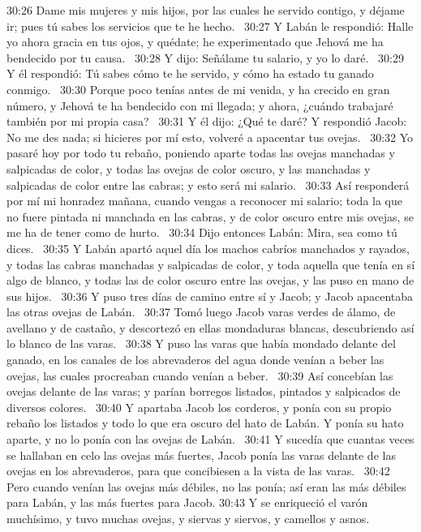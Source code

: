 30:26 Dame mis mujeres y mis hijos, por las cuales he servido contigo, y déjame ir; pues tú sabes los servicios que te he hecho.  
30:27 Y Labán le respondió: Halle yo ahora gracia en tus ojos, y quédate; he experimentado que Jehová me ha bendecido por tu causa.  
30:28 Y dijo: Señálame tu salario, y yo lo daré.  
30:29 Y él respondió: Tú sabes cómo te he servido, y cómo ha estado tu ganado conmigo.  
30:30 Porque poco tenías antes de mi venida, y ha crecido en gran número, y Jehová te ha bendecido con mi llegada; y ahora, ¿cuándo trabajaré también por mi propia casa?  
30:31 Y él dijo: ¿Qué te daré? Y respondió Jacob: No me des nada; si hicieres por mí esto, volveré a apacentar tus ovejas.  
30:32 Yo pasaré hoy por todo tu rebaño, poniendo aparte todas las ovejas manchadas y salpicadas de color, y todas las ovejas de color oscuro, y las manchadas y salpicadas de color entre las cabras; y esto será mi salario.  
30:33 Así responderá por mí mi honradez mañana, cuando vengas a reconocer mi salario; toda la que no fuere pintada ni manchada en las cabras, y de color oscuro entre mis ovejas, se me ha de tener como de hurto.  
30:34 Dijo entonces Labán: Mira, sea como tú dices.  
30:35 Y Labán apartó aquel día los machos cabríos manchados y rayados, y todas las cabras manchadas y salpicadas de color, y toda aquella que tenía en sí algo de blanco, y todas las de color oscuro entre las ovejas, y las puso en mano de sus hijos.  
30:36 Y puso tres días de camino entre sí y Jacob; y Jacob apacentaba las otras ovejas de Labán.  
30:37 Tomó luego Jacob varas verdes de álamo, de avellano y de castaño, y descortezó en ellas mondaduras blancas, descubriendo así lo blanco de las varas.  
30:38 Y puso las varas que había mondado delante del ganado, en los canales de los abrevaderos del agua donde venían a beber las ovejas, las cuales procreaban cuando venían a beber.  
30:39 Así concebían las ovejas delante de las varas; y parían borregos listados, pintados y salpicados de diversos colores.  
30:40 Y apartaba Jacob los corderos, y ponía con su propio rebaño los listados y todo lo que era oscuro del hato de Labán. Y ponía su hato aparte, y no lo ponía con las ovejas de Labán.  
30:41 Y sucedía que cuantas veces se hallaban en celo las ovejas más fuertes, Jacob ponía las varas delante de las ovejas en los abrevaderos, para que concibiesen a la vista de las varas.  
30:42 Pero cuando venían las ovejas más débiles, no las ponía; así eran las más débiles para Labán, y las más fuertes para Jacob. 
30:43 Y se enriqueció el varón muchísimo, y tuvo muchas ovejas, y siervas y siervos, y camellos y asnos.  
